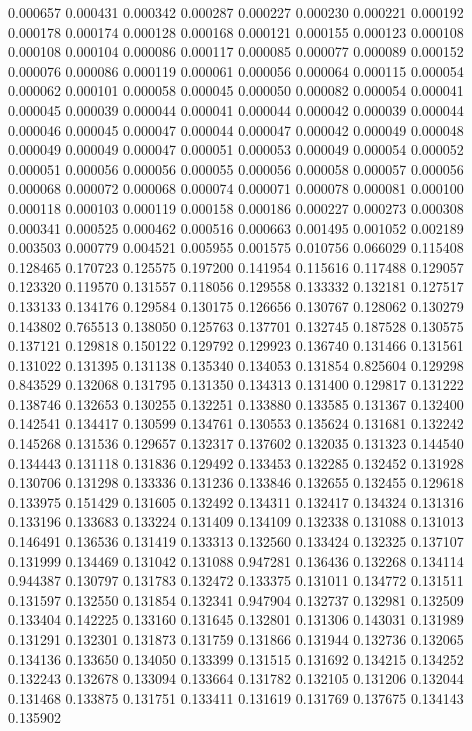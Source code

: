 0.000657
0.000431
0.000342
0.000287
0.000227
0.000230
0.000221
0.000192
0.000178
0.000174
0.000128
0.000168
0.000121
0.000155
0.000123
0.000108
0.000108
0.000104
0.000086
0.000117
0.000085
0.000077
0.000089
0.000152
0.000076
0.000086
0.000119
0.000061
0.000056
0.000064
0.000115
0.000054
0.000062
0.000101
0.000058
0.000045
0.000050
0.000082
0.000054
0.000041
0.000045
0.000039
0.000044
0.000041
0.000044
0.000042
0.000039
0.000044
0.000046
0.000045
0.000047
0.000044
0.000047
0.000042
0.000049
0.000048
0.000049
0.000049
0.000047
0.000051
0.000053
0.000049
0.000054
0.000052
0.000051
0.000056
0.000056
0.000055
0.000056
0.000058
0.000057
0.000056
0.000068
0.000072
0.000068
0.000074
0.000071
0.000078
0.000081
0.000100
0.000118
0.000103
0.000119
0.000158
0.000186
0.000227
0.000273
0.000308
0.000341
0.000525
0.000462
0.000516
0.000663
0.001495
0.001052
0.002189
0.003503
0.000779
0.004521
0.005955
0.001575
0.010756
0.066029
0.115408
0.128465
0.170723
0.125575
0.197200
0.141954
0.115616
0.117488
0.129057
0.123320
0.119570
0.131557
0.118056
0.129558
0.133332
0.132181
0.127517
0.133133
0.134176
0.129584
0.130175
0.126656
0.130767
0.128062
0.130279
0.143802
0.765513
0.138050
0.125763
0.137701
0.132745
0.187528
0.130575
0.137121
0.129818
0.150122
0.129792
0.129923
0.136740
0.131466
0.131561
0.131022
0.131395
0.131138
0.135340
0.134053
0.131854
0.825604
0.129298
0.843529
0.132068
0.131795
0.131350
0.134313
0.131400
0.129817
0.131222
0.138746
0.132653
0.130255
0.132251
0.133880
0.133585
0.131367
0.132400
0.142541
0.134417
0.130599
0.134761
0.130553
0.135624
0.131681
0.132242
0.145268
0.131536
0.129657
0.132317
0.137602
0.132035
0.131323
0.144540
0.134443
0.131118
0.131836
0.129492
0.133453
0.132285
0.132452
0.131928
0.130706
0.131298
0.133336
0.131236
0.133846
0.132655
0.132455
0.129618
0.133975
0.151429
0.131605
0.132492
0.134311
0.132417
0.134324
0.131316
0.133196
0.133683
0.133224
0.131409
0.134109
0.132338
0.131088
0.131013
0.146491
0.136536
0.131419
0.133313
0.132560
0.133424
0.132325
0.137107
0.131999
0.134469
0.131042
0.131088
0.947281
0.136436
0.132268
0.134114
0.944387
0.130797
0.131783
0.132472
0.133375
0.131011
0.134772
0.131511
0.131597
0.132550
0.131854
0.132341
0.947904
0.132737
0.132981
0.132509
0.133404
0.142225
0.133160
0.131645
0.132801
0.131306
0.143031
0.131989
0.131291
0.132301
0.131873
0.131759
0.131866
0.131944
0.132736
0.132065
0.134136
0.133650
0.134050
0.133399
0.131515
0.131692
0.134215
0.134252
0.132243
0.132678
0.133094
0.133664
0.131782
0.132105
0.131206
0.132044
0.131468
0.133875
0.131751
0.133411
0.131619
0.131769
0.137675
0.134143
0.135902

